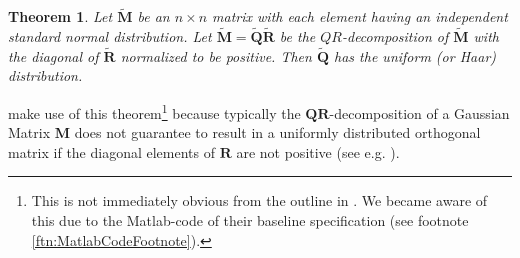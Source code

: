 \documentclass[a4paper,11pt,listof=nochaptergap,oneside,pointednumbers,bibtotoc,bigheadings,liststotoc,hidelinks]{scrbook}
\theoremstyle{mysatz}
\theoremstyle{mydefinition}
\theoremstyle{mytheorem}
\newtheorem{theo}[satz]{Theorem}
\theoremstyle{mybemerkung}
\newcommand{\vect}[1]{\boldsymbol{\mathbf{#1}}}
\begin{document}
\begin{theo}
Let $\widetilde{\vect{M}}$ be an $n\times n$ matrix with each element having an independent standard normal distribution. Let $\widetilde{\vect{M}} = \widetilde{\vect{Q}}\widetilde{\vect{R}}$ be the $QR$-decomposition of $\widetilde{\vect{M}}$ with the diagonal of $\widetilde{\vect{R}}$ normalized to be positive. Then $\widetilde{\vect{Q}}$ has the uniform (or Haar) distribution.
\end{theo}

\citet{ludvigsonetal:18} make use of this theorem\footnote{This is not immediately obvious from the outline in \citet{ludvigsonetal:18}. We became aware of this due to the Matlab-code of their baseline specification (see footnote \ref{ftn:MatlabCodeFootnote}).} because typically the $\vect{QR}$-decomposition of a Gaussian Matrix $\vect{M}$ does not guarantee to result in a uniformly distributed orthogonal matrix if the diagonal elements of $\vect{R}$ are not positive (see e.g. \citealp{edelman:05}).
\end{document}
